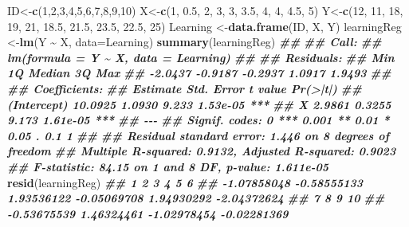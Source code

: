 \documentclass[
]{book}
\newenvironment{Shaded}{\begin{snugshade}}{\end{snugshade}}
\newcommand{\AttributeTok}[1]{\textcolor[rgb]{0.13,0.29,0.53}{#1}}
\newcommand{\DecValTok}[1]{\textcolor[rgb]{0.00,0.00,0.81}{#1}}
\newcommand{\DocumentationTok}[1]{\textcolor[rgb]{0.56,0.35,0.01}{\textbf{\textit{#1}}}}
\newcommand{\FloatTok}[1]{\textcolor[rgb]{0.00,0.00,0.81}{#1}}
\newcommand{\FunctionTok}[1]{\textcolor[rgb]{0.13,0.29,0.53}{\textbf{#1}}}
\newcommand{\NormalTok}[1]{#1}
\newcommand{\OtherTok}[1]{\textcolor[rgb]{0.56,0.35,0.01}{#1}}
\newcommand{\SpecialCharTok}[1]{\textcolor[rgb]{0.81,0.36,0.00}{\textbf{#1}}}
\begin{document}
\begin{Shaded}
\begin{Highlighting}[]
\NormalTok{ID}\OtherTok{\textless{}{-}}\FunctionTok{c}\NormalTok{(}\DecValTok{1}\NormalTok{,}\DecValTok{2}\NormalTok{,}\DecValTok{3}\NormalTok{,}\DecValTok{4}\NormalTok{,}\DecValTok{5}\NormalTok{,}\DecValTok{6}\NormalTok{,}\DecValTok{7}\NormalTok{,}\DecValTok{8}\NormalTok{,}\DecValTok{9}\NormalTok{,}\DecValTok{10}\NormalTok{) }
\NormalTok{X}\OtherTok{\textless{}{-}}\FunctionTok{c}\NormalTok{(}\DecValTok{1}\NormalTok{, }\FloatTok{0.5}\NormalTok{, }\DecValTok{2}\NormalTok{, }\DecValTok{3}\NormalTok{, }\DecValTok{3}\NormalTok{, }\FloatTok{3.5}\NormalTok{, }\DecValTok{4}\NormalTok{, }\DecValTok{4}\NormalTok{, }\FloatTok{4.5}\NormalTok{, }\DecValTok{5}\NormalTok{)}
\NormalTok{Y}\OtherTok{\textless{}{-}}\FunctionTok{c}\NormalTok{(}\DecValTok{12}\NormalTok{, }\DecValTok{11}\NormalTok{, }\DecValTok{18}\NormalTok{, }\DecValTok{19}\NormalTok{, }\DecValTok{21}\NormalTok{, }\FloatTok{18.5}\NormalTok{, }\FloatTok{21.5}\NormalTok{, }\FloatTok{23.5}\NormalTok{, }\FloatTok{22.5}\NormalTok{, }\DecValTok{25}\NormalTok{)}
\NormalTok{Learning }\OtherTok{\textless{}{-}}\FunctionTok{data.frame}\NormalTok{(ID, X, Y)}
\NormalTok{learningReg }\OtherTok{\textless{}{-}}\FunctionTok{lm}\NormalTok{(Y }\SpecialCharTok{\textasciitilde{}}\NormalTok{ X, }\AttributeTok{data=}\NormalTok{Learning)}
\FunctionTok{summary}\NormalTok{(learningReg)}
\DocumentationTok{\#\# }
\DocumentationTok{\#\# Call:}
\DocumentationTok{\#\# lm(formula = Y \textasciitilde{} X, data = Learning)}
\DocumentationTok{\#\# }
\DocumentationTok{\#\# Residuals:}
\DocumentationTok{\#\#     Min      1Q  Median      3Q     Max }
\DocumentationTok{\#\# {-}2.0437 {-}0.9187 {-}0.2937  1.0917  1.9493 }
\DocumentationTok{\#\# }
\DocumentationTok{\#\# Coefficients:}
\DocumentationTok{\#\#             Estimate Std. Error t value Pr(\textgreater{}|t|)    }
\DocumentationTok{\#\# (Intercept)  10.0925     1.0930   9.233 1.53e{-}05 ***}
\DocumentationTok{\#\# X             2.9861     0.3255   9.173 1.61e{-}05 ***}
\DocumentationTok{\#\# {-}{-}{-}}
\DocumentationTok{\#\# Signif. codes:  0 \textquotesingle{}***\textquotesingle{} 0.001 \textquotesingle{}**\textquotesingle{} 0.01 \textquotesingle{}*\textquotesingle{} 0.05 \textquotesingle{}.\textquotesingle{} 0.1 \textquotesingle{} \textquotesingle{} 1}
\DocumentationTok{\#\# }
\DocumentationTok{\#\# Residual standard error: 1.446 on 8 degrees of freedom}
\DocumentationTok{\#\# Multiple R{-}squared:  0.9132, Adjusted R{-}squared:  0.9023 }
\DocumentationTok{\#\# F{-}statistic: 84.15 on 1 and 8 DF,  p{-}value: 1.611e{-}05}
\FunctionTok{resid}\NormalTok{(learningReg)}
\DocumentationTok{\#\#           1           2           3           4           5           6 }
\DocumentationTok{\#\# {-}1.07858048 {-}0.58555133  1.93536122 {-}0.05069708  1.94930292 {-}2.04372624 }
\DocumentationTok{\#\#           7           8           9          10 }
\DocumentationTok{\#\# {-}0.53675539  1.46324461 {-}1.02978454 {-}0.02281369}
\end{Highlighting}
\end{Shaded}
\end{document}
